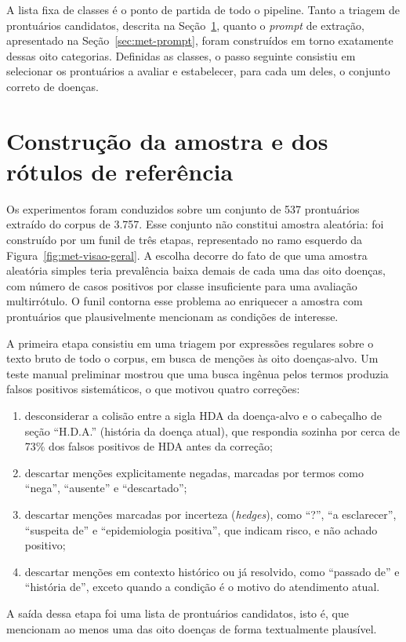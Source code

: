 A lista fixa de classes é o ponto de partida de todo o pipeline. Tanto a triagem de prontuários candidatos, descrita na Seção~\ref{sec:met-amostra}, quanto o \textit{prompt} de extração, apresentado na Seção~\ref{sec:met-prompt}, foram construídos em torno exatamente dessas oito categorias. Definidas as classes, o passo seguinte consistiu em selecionar os prontuários a avaliar e estabelecer, para cada um deles, o conjunto correto de doenças.

\section{Construção da amostra e dos rótulos de referência}\label{sec:met-amostra}

Os experimentos foram conduzidos sobre um conjunto de 537 prontuários extraído do corpus de 3.757. Esse conjunto não constitui amostra aleatória: foi construído por um funil de três etapas, representado no ramo esquerdo da Figura~\ref{fig:met-visao-geral}. A escolha decorre do fato de que uma amostra aleatória simples teria prevalência baixa demais de cada uma das oito doenças, com número de casos positivos por classe insuficiente para uma avaliação multirrótulo. O funil contorna esse problema ao enriquecer a amostra com prontuários que plausivelmente mencionam as condições de interesse.

A primeira etapa consistiu em uma triagem por expressões regulares sobre o texto bruto de todo o corpus, em busca de menções às oito doenças-alvo. Um teste manual preliminar mostrou que uma busca ingênua pelos termos produzia falsos positivos sistemáticos, o que motivou quatro correções:
\begin{enumerate}
    \item desconsiderar a colisão entre a sigla HDA da doença-alvo e o cabeçalho de seção ``H.D.A.'' (história da doença atual), que respondia sozinha por cerca de 73\% dos falsos positivos de HDA antes da correção;
    \item descartar menções explicitamente negadas, marcadas por termos como ``nega'', ``ausente'' e ``descartado'';
    \item descartar menções marcadas por incerteza (\textit{hedges}), como ``?'', ``a esclarecer'', ``suspeita de'' e ``epidemiologia positiva'', que indicam risco, e não achado positivo;
    \item descartar menções em contexto histórico ou já resolvido, como ``passado de'' e ``história de'', exceto quando a condição é o motivo do atendimento atual.
\end{enumerate}
A saída dessa etapa foi uma lista de prontuários candidatos, isto é, que mencionam ao menos uma das oito doenças de forma textualmente plausível.


